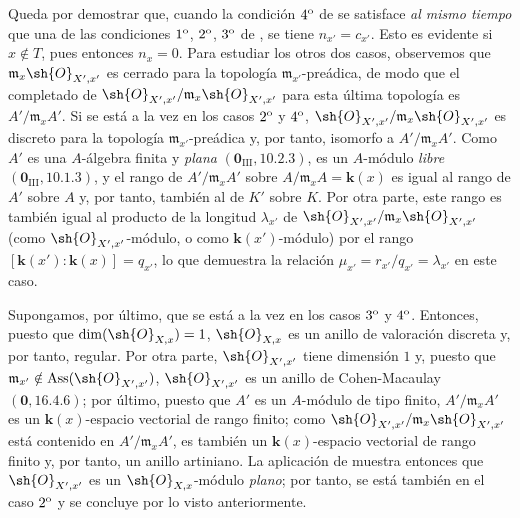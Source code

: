 \begin{env}[21.10.11]
\label{IV.21.10.11}
Queda por demostrar que, cuando la condición $4\textsuperscript{o}$ de  se satisface \emph{al mismo tiempo} que una de las condiciones $1\textsuperscript{o}$, $2\textsuperscript{o}$, $3\textsuperscript{o}$ de , se tiene $n_{x'}=c_{x'}$.
Esto es evidente si $x\notin T$, pues entonces $n_x=0$.
Para estudiar los otros dos casos, observemos que $\mathfrak{m}_x\sh{O}_{X',x'}$ es cerrado para la topología $\mathfrak{m}_{x'}$-preádica, de modo que el completado de $\sh{O}_{X',x'}/\mathfrak{m}_x\sh{O}_{X',x'}$ para esta última topología es $A'/\mathfrak{m}_xA'$.
Si se está a la vez en los casos $2\textsuperscript{o}$ y $4\textsuperscript{o}$, $\sh{O}_{X',x'}/\mathfrak{m}_x\sh{O}_{X',x'}$ es discreto para la topología $\mathfrak{m}_{x'}$-preádica y, por tanto, isomorfo a $A'/\mathfrak{m}_xA'$.
Como $A'$ es una $A$-álgebra finita y \emph{plana} $(\mathbf{0}_{\mathrm{III}},10.2.3)$, es un $A$-módulo \emph{libre} $(\mathbf{0}_{\mathrm{III}},10.1.3)$, y el rango de $A'/\mathfrak{m}_xA'$ sobre $A/\mathfrak{m}_xA=\boldsymbol{k}(x)$ es igual al rango de $A'$ sobre $A$ y, por tanto, también al de $K'$ sobre $K$.
Por otra parte, este rango es también igual al producto de la longitud $\lambda_{x'}$ de $\sh{O}_{X',x'}/\mathfrak{m}_x\sh{O}_{X',x'}$ (como $\sh{O}_{X',x'}$-módulo, o como $\boldsymbol{k}(x')$-módulo) por el rango $[\boldsymbol{k}(x'): \boldsymbol{k}(x)]=q_{x'}$, lo que demuestra la relación $\mu_{x'}=r_{x'}/q_{x'}=\lambda_{x'}$ en este caso.

Supongamos, por último, que se está a la vez en los casos $3\textsuperscript{o}$ y $4\textsuperscript{o}$.
Entonces, puesto que $\dim(\sh{O}_{X,x})=1$, $\sh{O}_{X,x}$ es un anillo de valoración discreta y, por tanto, regular.
Por otra parte, $\sh{O}_{X',x'}$ tiene dimensión $1$ y, puesto que $\mathfrak{m}_{x'}\notin\operatorname{Ass}(\sh{O}_{X',x'})$, $\sh{O}_{X',x'}$ es un anillo de Cohen-Macaulay $(\mathbf{0},16.4.6)$;
por último, puesto que $A'$ es un $A$-módulo de tipo finito, $A'/\mathfrak{m}_xA'$ es un $\boldsymbol{k}(x)$-espacio vectorial de rango finito;
como $\sh{O}_{X',x'}/\mathfrak{m}_x\sh{O}_{X',x'}$ está contenido en $A'/\mathfrak{m}_xA'$, es también un $\boldsymbol{k}(x)$-espacio vectorial de rango finito y, por tanto, un anillo artiniano.
La aplicación de  muestra entonces que $\sh{O}_{X',x'}$ es un $\sh{O}_{X,x}$-módulo \emph{plano}; por tanto, se está también en el caso $2\textsuperscript{o}$ y se concluye por lo visto anteriormente.


\end{env}

